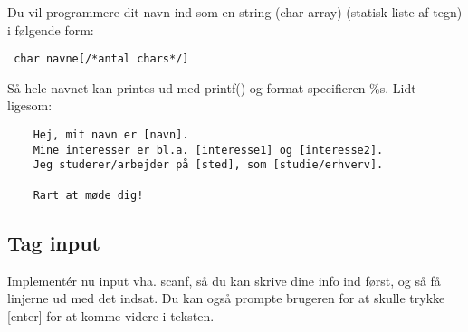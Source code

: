 \documentclass[hidelinks]{article} %
\begin{document}
Du vil programmere dit navn ind som en string (char array) (statisk liste af tegn) i følgende form:
\begin{verbatim} char navne[/*antal chars*/]
\end{verbatim}
Så hele navnet kan printes ud med printf() og format specifieren \%s.
Lidt ligesom:
\begin{verbatim}
	Hej, mit navn er [navn].
	Mine interesser er bl.a. [interesse1] og [interesse2].
	Jeg studerer/arbejder på [sted], som [studie/erhverv].
	
	Rart at møde dig!
\end{verbatim}
	\subsection{Tag input}
	Implementér nu input vha. scanf, så du kan skrive dine info ind først, og så få linjerne ud med det indsat. Du kan også prompte brugeren for at skulle trykke [enter] for at komme videre i teksten.
\end{document}
